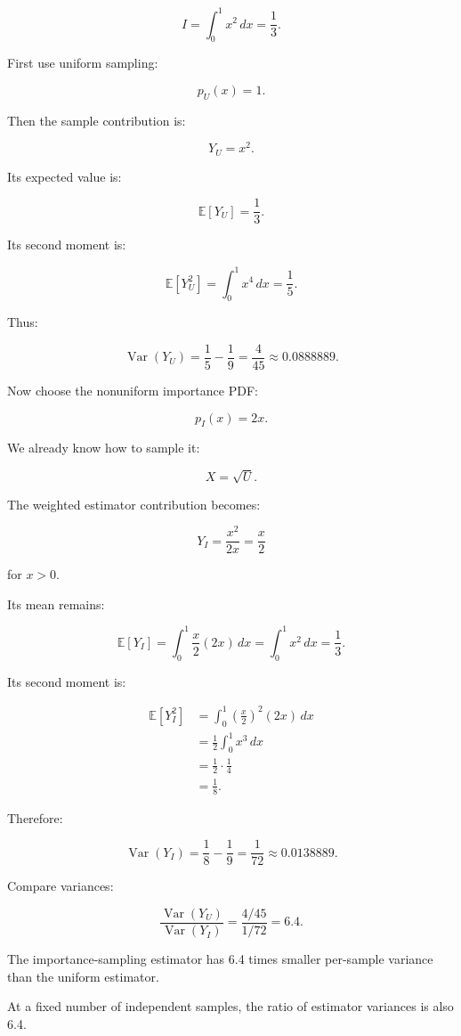 \[
 I=\int_0^1x^2\,dx=\boxed{\frac13}.
\]

First use uniform sampling:

\[
 p_U(x)=1.
\]

Then the sample contribution is:

\[
 Y_U=x^2.
\]

Its expected value is:

\[
 \mathbb E[Y_U]=\frac13.
\]

Its second moment is:

\[
 \mathbb E[Y_U^2] = \int_0^1x^4\,dx =\frac15.
\]

Thus:

\[
 \operatorname{Var}(Y_U) = \frac15-\frac19 = \boxed{\frac4{45}} \approx0.0888889.
\]

Now choose the nonuniform importance PDF:

\[
 p_I(x)=2x.
\]

We already know how to sample it:

\[
 X=\sqrt U.
\]

The weighted estimator contribution becomes:

\[
 Y_I= \frac{x^2}{2x} =\frac x2
\]

for \(x>0\).

Its mean remains:

\[
 \mathbb E[Y_I] = \int_0^1\frac x2(2x)\,dx = \int_0^1x^2\,dx =\frac13.
\]

Its second moment is:

\[
 \begin{aligned} \mathbb E[Y_I^2] &= \int_0^1\left(\frac x2\right)^2(2x)\,dx\\ &= \frac12\int_0^1x^3\,dx\\ &=\frac12\cdot\frac14\\ &=\frac18. \end{aligned}
\]

Therefore:

\[
 \operatorname{Var}(Y_I) = \frac18-\frac19 = \boxed{\frac1{72}} \approx0.0138889.
\]

Compare variances:

\[
 \boxed{ \frac{\operatorname{Var}(Y_U)} {\operatorname{Var}(Y_I)} = \frac{4/45}{1/72} =6.4 }.
\]

The importance-sampling estimator has 6.4 times smaller per-sample variance than the uniform estimator.

At a fixed number of independent samples, the ratio of estimator variances is also 6.4.

